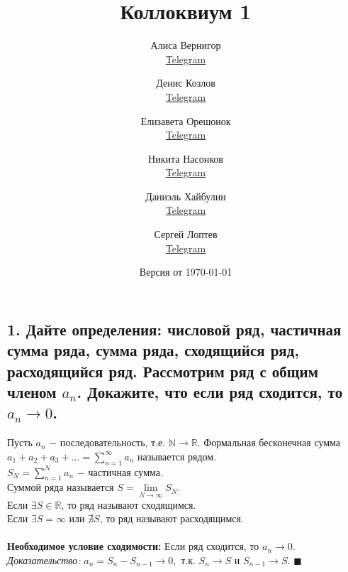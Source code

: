 \documentclass[a4paper, fleqn]{article}
\title{Коллоквиум 1}
\author{
    Алиса Вернигор       \\ \href{https://t.me/allisyonok}{Telegram} \and
    Денис Козлов         \\ \href{https://t.me/DKozl50}{Telegram} \and
    Елизавета Орешонок   \\ \href{https://t.me/eaoresh}{Telegram} \and
    Никита Насонков      \\ \href{https://t.me/nnv_nick}{Telegram} \and
    Даниэль Хайбулин      \\ \href{https://t.me/kiDaniel}{Telegram} \and
    Сергей Лоптев        \\ \href{https://t.me/beast_sl}{Telegram}
}
\date{Версия от {\ddmmyyyydate\today} \currenttime}
\begin{document}
    \maketitle
    
    
    \subsection*{1. Дайте определения: числовой ряд, частичная сумма ряда, сумма ряда, сходящийся ряд, расходящийся ряд. Рассмотрим ряд с общим членом $a_n$. Докажите, что если ряд сходится, то $a_n \rightarrow 0$.}
    Пусть $a_n$ $-$ последовательность, т.е. $\mathbb{N} \rightarrow \mathbb{R}$. 
    Формальная бесконечная сумма $a_1 + a_2 + a_3 + ... = \sum\limits_{n = 1}^{\infty} a_n$ называется рядом. \\
    $S_N = \sum\limits_{n = 1}^N a_n$ $-$ частичная сумма. \\
    Суммой ряда называется $S = \lim\limits_{N\rightarrow \infty} S_N$. \\
    Если $\exists S \in \mathbb{R}$, то ряд называют сходящимся. \\
    Если $\exists S = \infty$ или $\nexists S$, то ряд называют расходящимся. \\ \\
    \textbf{Необходимое условие сходимости: } Если ряд сходится, то $a_n \rightarrow 0$. \\
    \textit{Доказательство: } $a_n = S_n - S_{n - 1} \rightarrow 0, $ т.к. $S_n \rightarrow S$ и $S_{n - 1} \rightarrow S$. $\blacksquare$ \\

\end{document}

